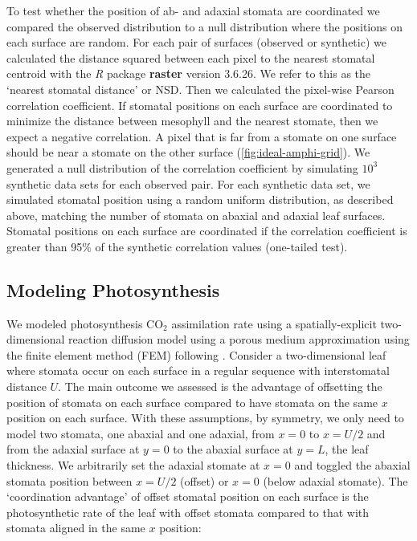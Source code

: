 \documentclass[webpdf,large,modern,unnumsec,namedate]{oup-authoring-template}
\begin{document}
To test whether the position of ab- and adaxial stomata are coordinated
we compared the observed distribution to a null distribution where the
positions on each surface are random. For each pair of surfaces
(observed or synthetic) we calculated the distance squared between each
pixel to the nearest stomatal centroid with the \emph{R} package
\textbf{raster} version 3.6.26. We refer to this as the `nearest
stomatal distance' or NSD. Then we calculated the pixel-wise Pearson
correlation coefficient. If stomatal positions on each surface are
coordinated to minimize the distance between mesophyll and the nearest
stomate, then we expect a negative correlation. A pixel that is far from
a stomate on one surface should be near a stomate on the other surface
(\autoref{fig:ideal-amphi-grid}). We generated a null distribution of
the correlation coefficient by simulating \(10^3\) synthetic data sets
for each observed pair. For each synthetic data set, we simulated
stomatal position using a random uniform distribution, as described
above, matching the number of stomata on abaxial and adaxial leaf
surfaces. Stomatal positions on each surface are coordinated if the
correlation coefficient is greater than 95\% of the synthetic
correlation values (one-tailed test).

\hypertarget{modeling-photosynthesis}{%
\subsection{Modeling Photosynthesis}\label{modeling-photosynthesis}}

We modeled photosynthesis CO\(_2\) assimilation rate using a
spatially-explicit two-dimensional reaction diffusion model using a
porous medium approximation \citep{parkhurst_diffusion_1994} using the
finite element method (FEM) following \citet{earles_excess_2017}.
Consider a two-dimensional leaf where stomata occur on each surface in a
regular sequence with interstomatal distance \(U\). The main outcome we
assessed is the advantage of offsetting the position of stomata on each
surface compared to have stomata on the same \(x\) position on each
surface. With these assumptions, by symmetry, we only need to model two
stomata, one abaxial and one adaxial, from \(x = 0\) to \(x = U/2\) and
from the adaxial surface at \(y = 0\) to the abaxial surface at
\(y = L\), the leaf thickness. We arbitrarily set the adaxial stomate at
\(x = 0\) and toggled the abaxial stomata position between \(x = U/2\)
(offset) or \(x = 0\) (below adaxial stomate). The `coordination
advantage' of offset stomatal position on each surface is the
photosynthetic rate of the leaf with offset stomata compared to that
with stomata aligned in the same \(x\) position:
\end{document}

